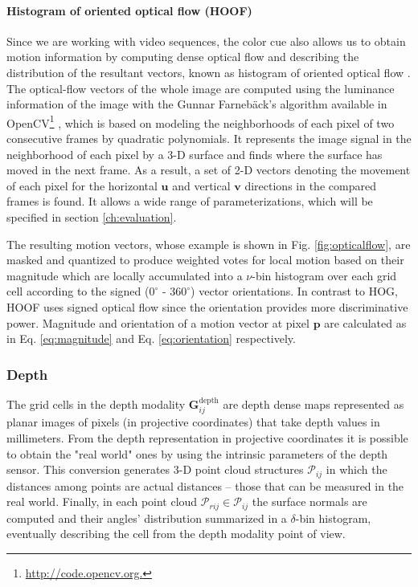 \documentclass[10pt,twocolumn,letterpaper]{article}
\begin{document}
\paragraph{Histogram of oriented optical flow (HOOF)} 
Since we are working with video sequences, the color cue also allows us to obtain motion information by computing dense optical flow and describing the distribution of the resultant vectors, known as histogram of oriented optical flow \cite{dalal2006human}. The optical-flow vectors of the whole image are computed using the luminance information of the image with the Gunnar Farneb\"{a}ck's algorithm \cite{farneback2003two} available in OpenCV\footnote{\url{http://code.opencv.org.}} \cite{bradski2008learning}, which is based on modeling the neighborhoods of each pixel of two consecutive frames by quadratic polynomials. It represents the image signal in the neighborhood of each pixel by a 3-D surface and finds where the surface has moved in the next frame. As a result, a set of 2-D vectors denoting the movement of each pixel for the horizontal $\mathbf{u}$ and vertical $\mathbf{v}$ directions in the compared frames is found. It allows a wide range of parameterizations, which will be specified in section \ref{ch:evaluation}.

 The resulting motion vectors, whose example is shown in Fig. \ref{fig:opticalflow}, are masked and quantized to produce weighted votes for local motion based on their magnitude which are locally accumulated into a $\nu$-bin histogram over each grid cell according to the signed ($0^\circ$ - $360^\circ$) vector orientations. In contrast to HOG, HOOF uses signed optical flow since the orientation provides more discriminative power. Magnitude and orientation of a motion vector at pixel $\mathbf{p}$ are calculated as in Eq. \ref{eq:magnitude} and Eq. \ref{eq:orientation} respectively.

\subsubsection{Depth}
\label{sssec:depth}

The grid cells in the depth modality $\mathbf{G}_{ij}^\mathrm{depth}$ are depth dense maps represented as planar images of pixels (in projective coordinates) that take depth values in millimeters. From the depth representation in projective coordinates it is possible to obtain the "real world" ones by using the intrinsic parameters of the depth sensor. This conversion generates 3-D point cloud structures $\mathcal{P}_{ij}$ in which the distances among points are actual distances -- those that can be measured in the real world. Finally, in each point cloud $\mathcal{P}_{rij} \in \mathcal{P}_{ij}$ the surface normals are computed and their angles' distribution summarized in a $\delta$-bin histogram, eventually describing the cell from the depth modality point of view.
\end{document}

